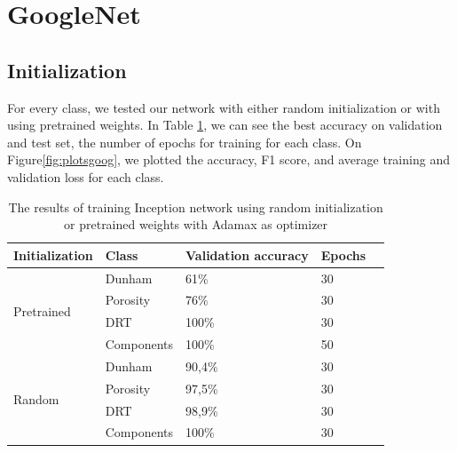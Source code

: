 

\section{GoogleNet}\label{sec:gogl}
\subsection{Initialization}
For every class, we tested our network with either random initialization or with using pretrained weights. In Table \ref{tab:googinit}, we can see the best accuracy on validation and test set, the number of epochs for training for each class.  
On Figure\ref{fig:plotsgoog}, we plotted the accuracy, F1 score, and average training and validation loss for each class. 

\begin{table}
\caption{\label{tab:googinit} The results of training Inception network using random initialization or pretrained weights with Adamax as optimizer}
\centering
\begin{tabular}[b]{| l | l | l | l | l |}
\hline
    Initialization & Class & Validation accuracy  & Epochs\\ \hline
    \multirow{4}{*}{Pretrained} & Dunham &  61\%  & 30 \\ %
    & Porosity & 76\% &  30 \\
    &DRT & 100\% &  30 \\
    &Components & 100\% &  50 \\ \hline
     \multirow{4}{*}{Random} & Dunham &  90,4\% & 30 \\
    & Porosity & 97,5\% &  30 \\
    &DRT & 98,9\% &  30 \\
    &Components & 100\% & 30 \\ \hline
\end{tabular} 
\end{table}

